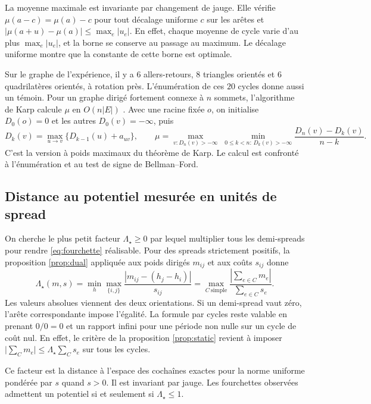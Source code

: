 \documentclass[11pt,a4paper]{article}
\theoremstyle{clair}
\newcommand{\arrowfx}{\mathbin{\to}}
\begin{document}
La moyenne maximale est invariante par changement de jauge. Elle vérifie $\mu(a-c)=\mu(a)-c$ pour tout décalage uniforme $c$ sur les arêtes et $|\mu(a+u)-\mu(a)|\le\max_e|u_e|$. En effet, chaque moyenne de cycle varie d'au plus $\max_e|u_e|$, et la borne se conserve au passage au maximum. Le décalage uniforme montre que la constante de cette borne est optimale.

Sur le graphe de l'expérience, il y a $6$ allers-retours, $8$ triangles orientés et $6$ quadrilatères orientés, à rotation près. L'énumération de ces $20$ cycles donne aussi un témoin. Pour un graphe dirigé fortement connexe à $n$ sommets, l'algorithme de Karp calcule $\mu$ en $O(n|E|)$ \cite{karp}. Avec une racine fixée $o$, on initialise $D_0(o)=0$ et les autres $D_0(v)=-\infty$, puis
\[
 D_k(v)=\max_{u\arrowfx v}\{D_{k-1}(u)+a_{uv}\},
 \qquad
 \mu=\max_{v:D_n(v)>-\infty}\;
      \min_{0\le k<n:\,D_k(v)>-\infty}\frac{D_n(v)-D_k(v)}{n-k}.
\]
C'est la version à poids maximaux du théorème de Karp. Le calcul est confronté à l'énumération et au test de signe de Bellman--Ford.

\subsection{Distance au potentiel mesurée en unités de spread}
\label{sec:dilatation}

On cherche le plus petit facteur \(\Lambda_\star\ge0\) par lequel multiplier tous les demi-spreads pour rendre \eqref{eq:fourchette} réalisable. Pour des spreads strictement positifs, la proposition \ref{prop:dual} appliquée aux poids dirigés \(m_{ij}\) et aux coûts \(s_{ij}\) donne
\begin{equation}
 \Lambda_\star(m,s)
 =\min_h\max_{\{i,j\}}\frac{|m_{ij}-(h_j-h_i)|}{s_{ij}}
 =\max_{C\ \mathrm{simple}}
       \frac{\left|\sum_{e\in C}m_e\right|}{\sum_{e\in C}s_e}.
 \label{eq:dilatation}
\end{equation}
Les valeurs absolues viennent des deux orientations. Si un demi-spread vaut zéro, l'arête correspondante impose l'égalité. La formule par cycles reste valable en prenant \(0/0=0\) et un rapport infini pour une période non nulle sur un cycle de coût nul. En effet, le critère de la proposition \ref{prop:static} revient à imposer \(\big|\sum_C m_e\big|\le\Lambda_\star\sum_C s_e\) sur tous les cycles.

Ce facteur est la distance à l'espace des cochaînes exactes pour la norme uniforme pondérée par \(s\) quand \(s>0\). Il est invariant par jauge. Les fourchettes observées admettent un potentiel si et seulement si \(\Lambda_\star\le1\).
\end{document}
